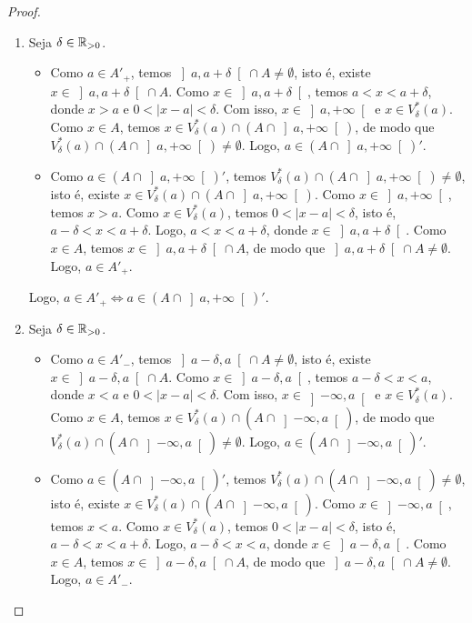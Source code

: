 \begin{proof}
    \leavevmode
        \begin{enumerate}[leftmargin=*, align=left, label=\textbf{(\alph*)}]
            \item Seja $\delta \in \mathbb{R}_{>0}$.
                \begin{itemize}
                    \item[($\Rightarrow$)] Como $a \in A'_+$, temos $\left]a, a+\delta\right[ \cap A \neq \emptyset$, isto é, existe $x \in \left]a, a+\delta\right[ \cap A$. Como $x \in \left]a, a+\delta\right[$, temos $a < x < a+\delta$, donde $x > a$ e $0 < |x-a| < \delta$. Com isso, $x \in \left]a,+\infty\right[$ e $x \in V^*_{\delta}(a)$. Como $x \in A$, temos $x \in V^*_{\delta}(a) \cap (A \cap \left]a,+\infty\right[)$, de modo que $V^*_{\delta}(a) \cap (A \cap \left]a,+\infty\right[) \neq \emptyset$. Logo, $a \in (A \cap \left]a,+\infty\right[)'$.
                    \item[($\Leftarrow$)] Como $a \in (A \cap \left]a,+\infty\right[)'$, temos $V^*_{\delta}(a) \cap (A \cap \left]a,+\infty\right[) \neq \emptyset$, isto é, existe $x \in V^*_{\delta}(a) \cap (A \cap \left]a,+\infty\right[)$. Como $x \in \left]a,+\infty\right[$, temos $x > a$. Como $x \in V^*_{\delta}(a)$, temos $0 < |x-a| < \delta$, isto é, $a - \delta < x < a + \delta$. Logo, $a < x < a + \delta$, donde $x \in \left]a, a+\delta\right[$. Como $x \in A$, temos $x \in \left]a, a+\delta\right[ \cap A$, de modo que $\left]a, a+\delta\right[ \cap A \neq \emptyset$. Logo, $a \in A'_+$.
                \end{itemize}
            Logo, $a \in A'_+ \Leftrightarrow a \in (A \cap \left]a,+\infty \right[)'$. \blackproof
            \item Seja $\delta \in \mathbb{R}_{>0}$.
                \begin{itemize}
                    \item[($\Rightarrow$)] Como $a \in A'_-$, temos $\left]a-\delta, a\right[ \cap A \neq \emptyset$, isto é, existe $x \in \left]a-\delta, a\right[ \cap A$. Como $x \in \left]a-\delta, a\right[$, temos $a-\delta < x < a$, donde $x < a$ e $0 < |x-a| < \delta$. Com isso, $x \in \left]-\infty,a\right[$ e $x \in V^*_{\delta}(a)$. Como $x \in A$, temos $x \in V^*_{\delta}(a) \cap (A \cap \left]-\infty,a\right[)$, de modo que $V^*_{\delta}(a) \cap (A \cap \left]-\infty,a\right[) \neq \emptyset$. Logo, $a \in (A \cap \left]-\infty,a\right[)'$.
                    \item[($\Leftarrow$)] Como $a \in (A \cap \left]-\infty,a\right[)'$, temos $V^*_{\delta}(a) \cap (A \cap \left]-\infty,a\right[) \neq \emptyset$, isto é, existe $x \in V^*_{\delta}(a) \cap (A \cap \left]-\infty,a\right[)$. Como $x \in \left]-\infty,a\right[$, temos $x < a$. Como $x \in V^*_{\delta}(a)$, temos $0 < |x-a| < \delta$, isto é, $a - \delta < x < a + \delta$. Logo, $a-\delta < x < a$, donde $x \in \left]a-\delta, a\right[$. Como $x \in A$, temos $x \in \left]a-\delta, a\right[ \cap A$, de modo que $\left]a-\delta, a\right[ \cap A \neq \emptyset$. Logo, $a \in A'_-$.

\end{itemize}
\end{enumerate}
\end{proof}
